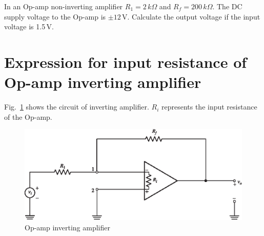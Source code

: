 \eject

\begin{example}\label{exam5.15}
In an Op-amp non-inverting amplifier $R_{1}=2\,k\Omega$ and $R_{f}=200\,k\Omega$. The DC supply voltage to the Op-amp is $\pm 12\,$V. Calculate the output voltage if the input voltage is 1.5\,V.
\end{example}


\section{Expression for input resistance of Op-amp inverting amplifier}\label{sec5.9}


Fig.~\ref{fig5.11} shows the circuit of inverting amplifier. $R_{i}$ represents the input resistance of the Op-amp.
\begin{figure}[H]
\centering
\includegraphics{chap4/S3-EE-06-018.eps}
\smallskip
\caption{Op-amp inverting amplifier}\label{fig5.11}
\end{figure}

